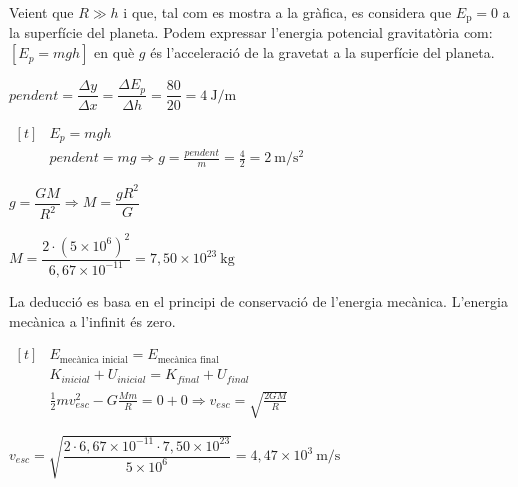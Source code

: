 \begin{solapartat}
\begin{minipage}[t]{0.55\linewidth}
Veient que $R \gg h$ i que, tal com es mostra a la gràfica, es considera que $E_\mathrm{p} = 0$ a la superfície del planeta. Podem expressar l'energia potencial gravitatòria com: $[E_p = mgh]$ en què $g$ és l'acceleració de la gravetat a la superfície del planeta.
\end{minipage}\hfill
\begin{minipage}[t]{0.42\linewidth}
\vspace{0pt}
\end{minipage}

\medskip
{} $\mathit{pendent} = \dfrac{\Delta y}{\Delta x} = \dfrac{\Delta E_p}{\Delta h} = \dfrac{80}{20} = 4\ \mathrm{J/m}$

\medskip
{}
$\begin{aligned}[t]
&E_p = mgh\\
&\mathit{pendent} = mg \Rightarrow g = \frac{\mathit{pendent}}{m} = \frac{4}{2} = 2\ \mathrm{m/s^2}
\end{aligned}$

\medskip
{} $g = \dfrac{GM}{R^2} \Rightarrow M = \dfrac{gR^2}{G}$

\medskip
{} $M = \dfrac{2\cdot\left(5\times 10^{6}\right)^2}{6,67\times 10^{-11}} = 7,50\times 10^{23}\ \mathrm{kg}$
\end{solapartat}

\begin{solapartat}
 La deducció es basa en el principi de conservació de l'energia mecànica. L'energia mecànica a l'infinit és zero.

\medskip
{}
$\begin{aligned}[t]
&E_{\text{mecànica inicial}} = E_{\text{mecànica final}}\\
&K_{\textit{inicial}} + U_{\textit{inicial}} = K_{\textit{final}} + U_{\textit{final}}\\
&\frac{1}{2}mv_{esc}^2 - G\frac{Mm}{R} = 0 + 0 \Rightarrow v_{esc} = \sqrt{\frac{2GM}{R}}
\end{aligned}$

\medskip
{} $v_{esc} = \sqrt{\dfrac{2\cdot 6,67\times 10^{-11}\cdot 7,50\times 10^{23}}{5\times 10^{6}}} = 4,47\times 10^{3}\ \mathrm{m/s}$
\end{solapartat}
